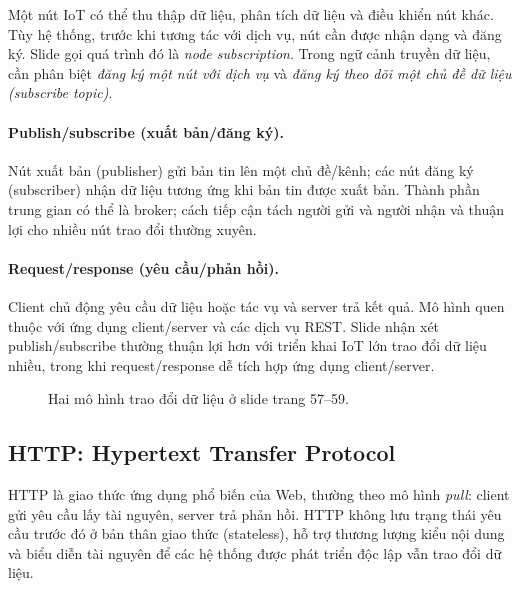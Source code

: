 Một nút IoT có thể thu thập dữ liệu, phân tích dữ liệu và điều khiển nút khác. Tùy hệ thống, trước khi tương tác với dịch vụ, nút cần được nhận dạng và đăng ký. Slide gọi quá trình đó là \emph{node subscription}. Trong ngữ cảnh truyền dữ liệu, cần phân biệt \emph{đăng ký một nút với dịch vụ} và \emph{đăng ký theo dõi một chủ đề dữ liệu (subscribe topic)}. 

\paragraph{Publish/subscribe (xuất bản/đăng ký).} Nút xuất bản (publisher) gửi bản tin lên một chủ đề/kênh; các nút đăng ký (subscriber) nhận dữ liệu tương ứng khi bản tin được xuất bản. Thành phần trung gian có thể là broker; cách tiếp cận tách người gửi và người nhận và thuận lợi cho nhiều nút trao đổi thường xuyên. 

\paragraph{Request/response (yêu cầu/phản hồi).} Client chủ động yêu cầu dữ liệu hoặc tác vụ và server trả kết quả. Mô hình quen thuộc với ứng dụng client/server và các dịch vụ REST. Slide nhận xét publish/subscribe thường thuận lợi hơn với triển khai IoT lớn trao đổi dữ liệu nhiều, trong khi request/response dễ tích hợp ứng dụng client/server. 

\begin{figure}[htbp]\centering
{}
\caption{Hai mô hình trao đổi dữ liệu ở slide trang 57--59.}\end{figure}

\subsection{HTTP: Hypertext Transfer Protocol}
HTTP là giao thức ứng dụng phổ biến của Web, thường theo mô hình \emph{pull}: client gửi yêu cầu lấy tài nguyên, server trả phản hồi. HTTP không lưu trạng thái yêu cầu trước đó ở bản thân giao thức (stateless), hỗ trợ thương lượng kiểu nội dung và biểu diễn tài nguyên để các hệ thống được phát triển độc lập vẫn trao đổi dữ liệu. 

